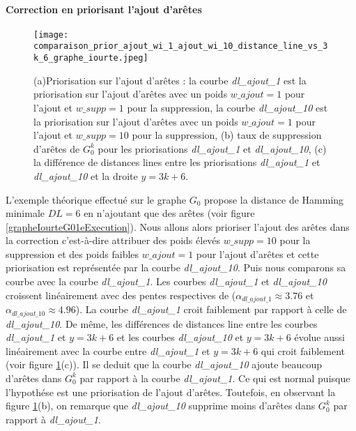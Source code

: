 \documentclass[onecolumn, 12pt]{book}
\begin{document}
\paragraph{Correction en priorisant l'ajout d'ar\^etes} %
\begin{figure}[htb!] 
\centering
\texttt{[image: comparaison\_prior\_ajout\_wi\_1\_ajout\_wi\_10\_distance\_line\_vs\_3k\_6\_graphe\_iourte.jpeg]}
\caption{(a)Priorisation sur l'ajout d'ar\^etes : la courbe {\em dl\_ajout\_1} est la priorisation sur l'ajout d'ar\^etes avec un poids $w\_ajout=1$ pour l'ajout et $w\_supp = 1$ pour la suppression,   la courbe {\em dl\_ajout\_10} est la priorisation sur l'ajout d'ar\^etes avec un poids $w\_ajout=1$ pour l'ajout et $w\_supp = 10$ pour la suppression, (b) taux de suppression d'ar\^etes de $G_0^k$ pour les priorisations  {\em dl\_ajout\_1} et  {\em dl\_ajout\_10}, (c) la diff\'erence de distances lines entre les priorisations {\em dl\_ajout\_1} et  {\em dl\_ajout\_10}  et la droite $y=3k+6$.  }
\label{priorAjout1Ajout10} 
\end{figure}
L'exemple th\'eorique effectu\'e sur le graphe $G_0$ propose la distance de Hamming minimale $DL= 6$ en n'ajoutant que des ar\^etes (voir figure \ref{grapheIourteG01eExecution}).
Nous allons alors prioriser l'ajout des ar\^etes dans la correction c'est-\`a-dire attribuer des poids \'elev\'es  $w\_supp = 10$ pour la suppression et des poids faibles $w\_ajout = 1$ pour l'ajout d'ar\^etes et cette priorisation est repr\'esent\'ee par la courbe {\em dl\_ajout\_10}. Puis nous comparons sa courbe  avec la courbe {\em dl\_ajout\_1}.
\newline
Les courbes {\em dl\_ajout\_1} et {\em dl\_ajout\_10} croissent lin\'eairement avec des pentes respectives de ($\alpha_{dl\_ajout\_1} \approx 3.76$ et $\alpha_{dl\_ajout\_10} \approx 4.96$).
La courbe {\em dl\_ajout\_1} croit faiblement par rapport \`a celle de {\em dl\_ajout\_10}.
De m\^eme, les diff\'erences de distances line entre les courbes {\em dl\_ajout\_1} et $y=3k+6$  et les courbes {\em dl\_ajout\_10} et $y=3k+6$  \'evolue aussi lin\'eairement avec la courbe entre 
 {\em dl\_ajout\_1} et $y=3k+6$ qui croit faiblement (voir figure \ref{priorAjout1Ajout10}(c)). 
 Il se deduit que la courbe {\em dl\_ajout\_10} ajoute beaucoup d'ar\^etes dans $G_0^k$ par rapport \`a la courbe  {\em dl\_ajout\_1}. 
Ce qui est normal puisque l'hypoth\'ese est une priorisation de l'ajout d'ar\^etes. 
Toutefois, en observant la figure \ref{priorAjout1Ajout10}(b), on remarque que {\em dl\_ajout\_10} supprime moins d'ar\^etes dans $G_0^k$ par rapport \`a {\em dl\_ajout\_1}.
\end{document}
